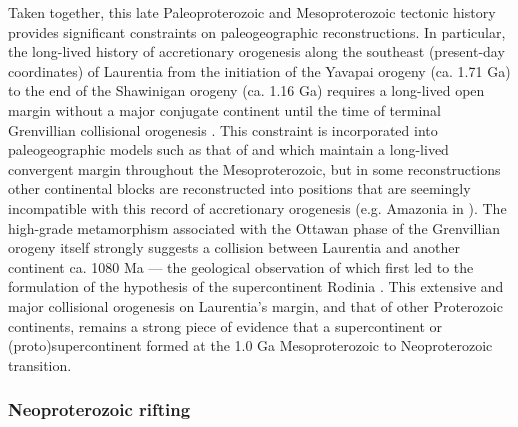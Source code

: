 \documentclass[twocolumn, switch]{article} %
\begin{document}
Taken together, this late Paleoproterozoic and Mesoproterozoic tectonic history provides significant constraints on paleogeographic reconstructions. In particular, the long-lived history of accretionary orogenesis along the southeast (present-day coordinates) of Laurentia from the initiation of the Yavapai orogeny (ca. 1.71 Ga) to the end of the Shawinigan orogeny (ca. 1.16 Ga) requires a long-lived open margin without a major conjugate continent until the time of terminal Grenvillian collisional orogenesis \citep{Karlstrom2001a}. This constraint is incorporated into paleogeographic models such as that of \citet{Zhang2012a} and \citet{Pehrsson2015a} which maintain a long-lived convergent margin throughout the Mesoproterozoic, but in some reconstructions other continental blocks are reconstructed into positions that are seemingly incompatible with this record of accretionary orogenesis (e.g. Amazonia in \citealp{Elming2009a, Elming2021a}). The high-grade metamorphism associated with the Ottawan phase of the Grenvillian orogeny itself strongly suggests a collision between Laurentia and another continent ca. 1080 Ma --- the geological observation of which first led to the formulation of the hypothesis of the supercontinent Rodinia \citep{Hoffman1991a}. This extensive and major collisional orogenesis on Laurentia's margin, and that of other Proterozoic continents, remains a strong piece of evidence that a supercontinent or (proto)supercontinent formed at the 1.0 Ga Mesoproterozoic to Neoproterozoic transition.

\subsubsection{Neoproterozoic rifting}
\end{document}
